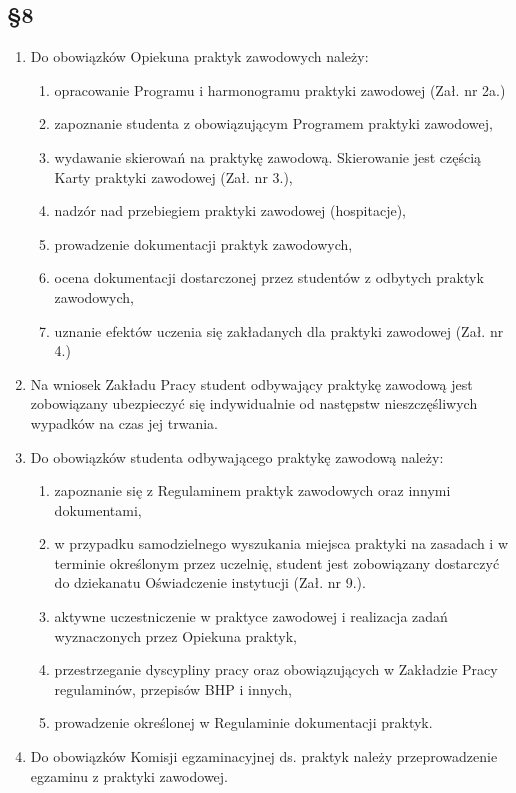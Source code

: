 \documentclass[12pt,a4paper]{article}
\begin{document}
\subsection*{\S 8}
\begin{enumerate}[label=\arabic*)]
    \item Do obowiązków Opiekuna praktyk zawodowych należy:
    \begin{enumerate}[label=\alph*)]
        \item opracowanie Programu i harmonogramu praktyki zawodowej (Zał. nr 2a.)
        \item zapoznanie studenta z obowiązującym Programem praktyki zawodowej,
        \item wydawanie skierowań na praktykę zawodową. Skierowanie jest częścią Karty praktyki zawodowej (Zał. nr 3.),
        \item nadzór nad przebiegiem praktyki zawodowej (hospitacje),
        \item prowadzenie dokumentacji praktyk zawodowych,
        \item ocena dokumentacji dostarczonej przez studentów z odbytych praktyk zawodowych,
        \item uznanie efektów uczenia się zakładanych dla praktyki zawodowej (Zał. nr 4.)
    \end{enumerate}
    \item Na wniosek Zakładu Pracy student odbywający praktykę zawodową jest zobowiązany ubezpieczyć się indywidualnie od następstw nieszczęśliwych wypadków na czas jej trwania.
    \item Do obowiązków studenta odbywającego praktykę zawodową należy:
    \begin{enumerate}[label=\alph*)]
        \item zapoznanie się z Regulaminem praktyk zawodowych oraz innymi dokumentami,
        \item w przypadku samodzielnego wyszukania miejsca praktyki na zasadach i w terminie określonym przez uczelnię, student jest zobowiązany dostarczyć do dziekanatu Oświadczenie instytucji (Zał. nr 9.).
        \item aktywne uczestniczenie w praktyce zawodowej i realizacja zadań wyznaczonych przez Opiekuna praktyk,
        \item przestrzeganie dyscypliny pracy oraz obowiązujących w Zakładzie Pracy regulaminów, przepisów BHP i innych,
        \item prowadzenie określonej w Regulaminie dokumentacji praktyk.
    \end{enumerate}
    \item Do obowiązków Komisji egzaminacyjnej ds. praktyk należy przeprowadzenie egzaminu z praktyki zawodowej.
\end{enumerate}
\end{document}
